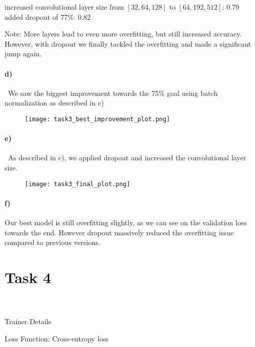 \documentclass{article}
\begin{document}
\indent increased convolutional layer size from $[32,64,128]$ to $[64, 192, 512]$: 0.79\\
\indent added dropout of 77\%: 0.82\\
\begin{adjustwidth}{1.2cm}{0pt}
	Note: More layers lead to even more overfitting, but still increased accuracy. However, with dropout we finally tackled the overfitting and made a significant jump again.\\
\end{adjustwidth}

\paragraph{d)}
\
We saw the biggest improvement towards the 75\% goal using batch normalization as described in c)


\begin{figure}[h!]
	\centering
	\texttt{[image: task3\_best\_improvement\_plot.png]}\label{hellnow}
\end{figure}

\newpage
\paragraph{e)}
\
As described in c), we applied dropout and increased the convolutional layer size.


\begin{figure}[h!]
	\centering
	\texttt{[image: task3\_final\_plot.png]}\label{hellono}
\end{figure}

\paragraph{f)}
Our best model is still overfitting slightly, as we can see on the validation loss towards the end. However dropout massively reduced the overfitting issue compared to previous versions.


\section*{Task 4}

\paragraph*{\ }
Trainer Details


Loss Function: Cross-entropy loss
\end{document}
